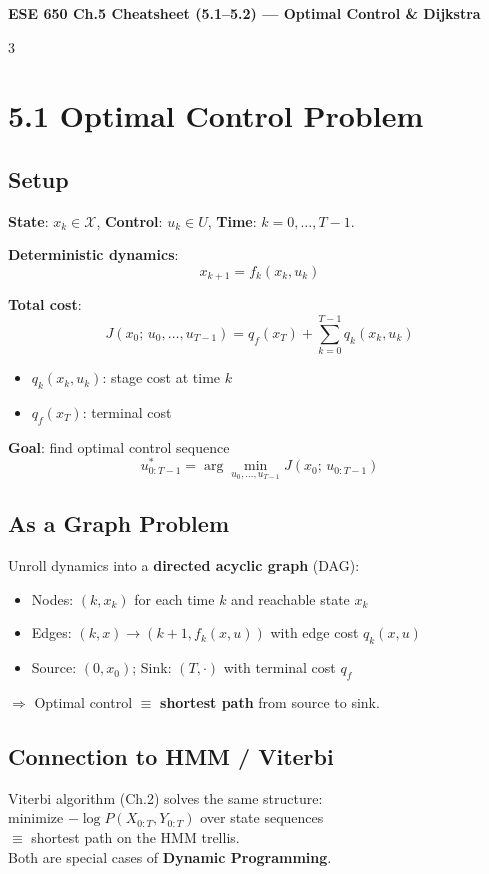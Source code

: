 \documentclass[9pt,landscape]{article}
\begin{document}
\begin{center}
  {\normalsize\bfseries ESE 650 Ch.5 Cheatsheet (5.1--5.2) --- Optimal Control \& Dijkstra}
\end{center}
\vspace{-4pt}
\begin{multicols}{3}

\section{5.1 Optimal Control Problem}

\subsection{Setup}
\textbf{State}: $x_k\in\mathcal{X}$, \textbf{Control}: $u_k\in U$, \textbf{Time}: $k=0,\ldots,T-1$.

\textbf{Deterministic dynamics}:
\[x_{k+1}=f_k(x_k,u_k)\]

\textbf{Total cost}:
\[\boxed{J(x_0;\,u_0,\ldots,u_{T-1})=q_f(x_T)+\sum_{k=0}^{T-1}q_k(x_k,u_k)}\]
\begin{itemize}
  \item $q_k(x_k,u_k)$: stage cost at time $k$
  \item $q_f(x_T)$: terminal cost
\end{itemize}

\textbf{Goal}: find optimal control sequence
\[u^*_{0:T-1}=\arg\min_{u_0,\ldots,u_{T-1}} J(x_0;\,u_{0:T-1})\]

\subsection{As a Graph Problem}
Unroll dynamics into a \textbf{directed acyclic graph} (DAG):
\begin{itemize}
  \item Nodes: $(k, x_k)$ for each time $k$ and reachable state $x_k$
  \item Edges: $(k,x)\to(k+1,f_k(x,u))$ with edge cost $q_k(x,u)$
  \item Source: $(0, x_0)$; Sink: $(T, \cdot)$ with terminal cost $q_f$
\end{itemize}
$\Rightarrow$ Optimal control $\equiv$ \textbf{shortest path} from source to sink.

\subsection{Connection to HMM / Viterbi}
Viterbi algorithm (Ch.2) solves the same structure:\\
minimize $-\log P(X_{0:T}, Y_{0:T})$ over state sequences\\
$\equiv$ shortest path on the HMM trellis.\\
Both are special cases of \textbf{Dynamic Programming}.


\end{multicols}
\end{document}
